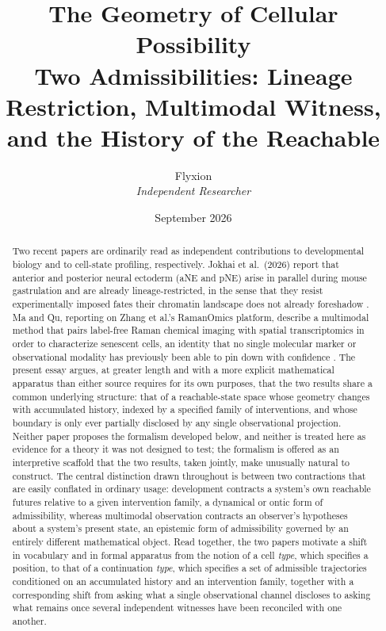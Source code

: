 \documentclass[11pt]{article}
\title{The Geometry of Cellular Possibility\\[4pt]
\large Two Admissibilities: Lineage Restriction, Multimodal Witness, and the History of the Reachable}
\author{Flyxion\\ \textit{Independent Researcher}}
\date{September 2026}
\begin{document}
\maketitle

\begin{abstract}
Two recent papers are ordinarily read as independent contributions to developmental biology and to cell-state profiling, respectively. Jokhai et al.\ (2026) report that anterior and posterior neural ectoderm (aNE and pNE) arise in parallel during mouse gastrulation and are already lineage-restricted, in the sense that they resist experimentally imposed fates their chromatin landscape does not already foreshadow \cite{jokhai2026}. Ma and Qu, reporting on Zhang et al.'s RamanOmics platform, describe a multimodal method that pairs label-free Raman chemical imaging with spatial transcriptomics in order to characterize senescent cells, an identity that no single molecular marker or observational modality has previously been able to pin down with confidence \cite{zhang2026,maqu2026}. The present essay argues, at greater length and with a more explicit mathematical apparatus than either source requires for its own purposes, that the two results share a common underlying structure: that of a reachable-state space whose geometry changes with accumulated history, indexed by a specified family of interventions, and whose boundary is only ever partially disclosed by any single observational projection. Neither paper proposes the formalism developed below, and neither is treated here as evidence for a theory it was not designed to test; the formalism is offered as an interpretive scaffold that the two results, taken jointly, make unusually natural to construct. The central distinction drawn throughout is between two contractions that are easily conflated in ordinary usage: development contracts a system's own reachable futures relative to a given intervention family, a dynamical or ontic form of admissibility, whereas multimodal observation contracts an observer's hypotheses about a system's present state, an epistemic form of admissibility governed by an entirely different mathematical object. Read together, the two papers motivate a shift in vocabulary and in formal apparatus from the notion of a cell \emph{type}, which specifies a position, to that of a continuation \emph{type}, which specifies a set of admissible trajectories conditioned on an accumulated history and an intervention family, together with a corresponding shift from asking what a single observational channel discloses to asking what remains once several independent witnesses have been reconciled with one another.
\end{abstract}
\end{document}

